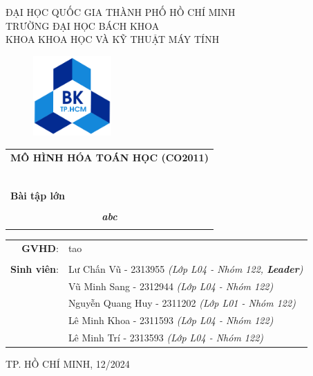 \documentclass[a4paper]{article}
\begin{document}
\begin{titlepage}
\begin{center}
ĐẠI HỌC QUỐC GIA THÀNH PHỐ HỒ CHÍ MINH\\
TRƯỜNG ĐẠI HỌC BÁCH KHOA\\
KHOA KHOA HỌC VÀ KỸ THUẬT MÁY TÍNH\\
\end{center}

\vspace{1cm}

\begin{figure}[h!]
\begin{center}
\includegraphics[width=3cm]{hcmut.png}
\end{center}
\end{figure}

\vspace{1cm}


\begin{center}
\begin{tabular}{c}
\multicolumn{1}{c}{\textbf{{\Large MÔ HÌNH HÓA TOÁN HỌC (CO2011)}}}\\
~~\\
\hline
\\
\multicolumn{1}{l}{\textbf{{\Large Bài tập lớn}}}\\
\\
\textbf{\textit{{\Huge abc}}}\\
\\
\hline
\end{tabular}
\end{center}

\vspace{2cm}

\begin{table}[h]
\centering
    \begin{tabular}{rl}
    \hspace{3 cm}\textbf{GVHD}:
    & tao\\

    & \\[10pt]
\textbf{Sinh viên}: & Lư Chấn Vũ - 2313955 \emph{(Lớp L04 - Nhóm 122, \textbf{Leader})} \\
& Vũ Minh Sang - 2312944 \emph{(Lớp L04 - Nhóm 122)} \\
& Nguyễn Quang Huy - 2311202 \emph{(Lớp L01 - Nhóm 122)} \\
& Lê Minh Khoa - 2311593 \emph{(Lớp L04 - Nhóm 122)} \\
& Lê Minh Trí - 2313593 \emph{(Lớp L04 - Nhóm 122)} \\
    \end{tabular}
\end{table}

\begin{center}
{\footnotesize TP. HỒ CHÍ MINH, 12/2024}
\end{center}
\end{titlepage}
\end{document}
